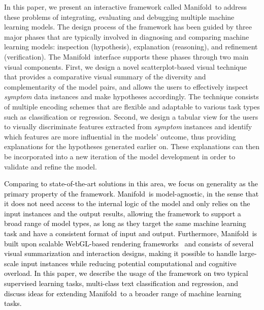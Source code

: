 \documentclass[preprint,journal]{vgtc}       %
\newcommand{\revcolor}{black}
\newcommand{\techname}{Manifold}
\begin{document}
In this paper, we present an interactive framework called \techname\ to address these problems of integrating, evaluating and debugging multiple machine learning models. The design process of the framework has been guided by three major phases that are typically involved in diagnosing and comparing machine learning models: inspection (hypothesis), explanation (reasoning), and refinement (verification). The \techname\ interface supports these phases through two main visual components. First, we design a novel scatterplot-based visual technique that provides a comparative visual summary of the diversity and complementarity of the model pairs, and allows the users to effectively inspect \textit{symptom} data instances and make hypotheses accordingly. The technique consists of multiple encoding schemes that are flexible and adaptable to various task types such as classification or regression. Second, we design a tabular view for the users to visually discriminate features extracted from \textit{symptom} instances and identify which features are more influential in the models' outcome, thus providing explanations for the hypotheses generated earlier on. These explanations can then be incorporated into a new iteration of the model development in order to validate and refine the model.

\textcolor{\revcolor}{Comparing to state-of-the-art solutions in this area, we focus on generality as the primary property of the framework. \techname\ is model-agnostic, in the sense that it does not need access to the internal logic of the model and only relies on the input instances and the output results, allowing the framework to support a broad range of model types, as long as they target the same machine learning task and have a consistent format of input and output. Furthermore, \techname\ is built upon scalable WebGL-based rendering frameworks~\cite{wang2017deckgl, lumagl} and consists of several visual summarization and interaction designs, making it possible to handle large-scale input instances while reducing potential computational and cognitive overload. In this paper, we describe the usage of the framework on two typical supervised learning tasks, multi-class text classification and regression, and discuss ideas for extending \techname\ to a broader range of machine learning tasks.}
\end{document}
